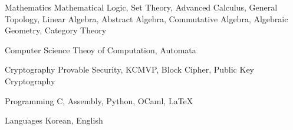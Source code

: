 


\begin{cvskills}


\cvskill
{Mathematics} %
{Mathematical Logic, Set Theory, Advanced Calculus, General Topology, Linear Algebra, Abstract Algebra,\hspace{30pt} Commutative Algebra, Algebraic Geometry, Category Theory} %


\cvskill
{Computer Science} %
{Theoy of Computation, Automata} %


\cvskill
{Cryptography} %
{Provable Security, KCMVP, Block Cipher, Public Key Cryptography} %


\cvskill
{Programming} %
{C, Assembly, Python, OCaml, LaTeX} %


\cvskill
{Languages} %
{Korean, English} %


\end{cvskills}